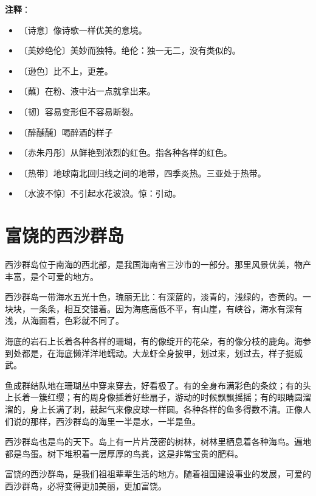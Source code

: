\documentclass[12pt,UTF-8,openany]{ctexbook}
\begin{document}
\newpage

\textbf{注释}：

\vspace{-1em}

\begin{itemize}
    \setlength\itemsep{-0.2em}
    \item 〔诗意〕像诗歌一样优美的意境。
    \item 〔美妙绝伦〕美妙而独特。绝伦：独一无二，没有类似的。
    \item 〔逊色〕比不上，更差。
    \item 〔蘸〕在粉、液中沾一点就拿出来。
    \item 〔韧〕容易变形但不容易断裂。
    \item 〔醉醺醺〕喝醉酒的样子
    \item 〔赤朱丹彤〕从鲜艳到浓烈的红色。指各种各样的红色。
    \item 〔热带〕地球南北回归线之间的地带，四季炎热。三亚处于热带。
    \item 〔水波不惊〕不引起水花波浪。惊：引动。
\end{itemize}

\chapter{富饶的西沙群岛}

\begin{large}
    
    西沙群岛位于南海的西北部，是我国海南省三沙市的一部分。那里风景优美，物产丰富，是个可爱的地方。
    
    西沙群岛一带海水五光十色，瑰丽无比：有深蓝的，淡青的，浅绿的，杏黄的。一块块，一条条，相互交错着。因为海底高低不平，有山崖，有峡谷，海水有深有浅，从海面看，色彩就不同了。
    
    海底的岩石上长着各种各样的珊瑚，有的像绽开的花朵，有的像分枝的鹿角。海参到处都是，在海底懒洋洋地蠕动。大龙虾全身披甲，划过来，划过去，样子挺威武。
    
    鱼成群结队地在珊瑚丛中穿来穿去，好看极了。有的全身布满彩色的条纹；有的头上长着一簇红缨；有的周身像插着好些扇子，游动的时候飘飘摇摇；有的眼睛圆溜溜的，身上长满了刺，鼓起气来像皮球一样圆。各种各样的鱼多得数不清。正像人们说的那样，西沙群岛的海里一半是水，一半是鱼。
    
    西沙群岛也是鸟的天下。岛上有一片片茂密的树林，树林里栖息着各种海鸟。遍地都是鸟蛋。树下堆积着一层厚厚的鸟粪，这是非常宝贵的肥料。
    
    富饶的西沙群岛，是我们祖祖辈辈生活的地方。随着祖国建设事业的发展，可爱的西沙群岛，必将变得更加美丽，更加富饶。
    
\end{large}
\end{document}
